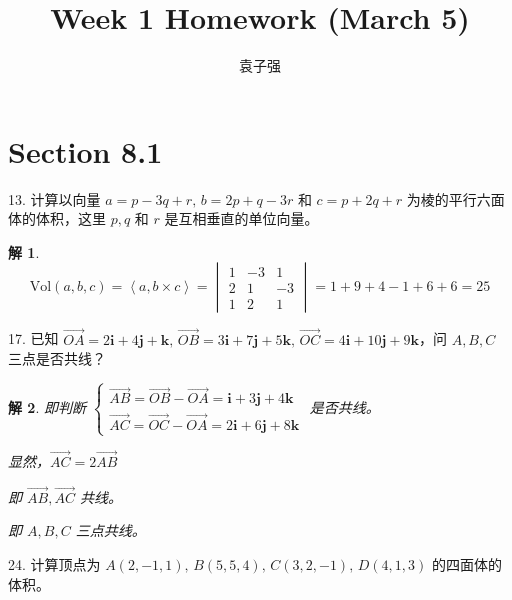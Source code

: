 \documentclass[a4paper,12pt]{article}
\title{Week 1 Homework (March 5)}
\author{袁子强}
\newtheorem*{解}{解}
\begin{document}
\maketitle

\section*{Section 8.1}

13. 计算以向量 $a=p-3q+r,\,b=2p+q-3r$ 和 $c=p+2q+r$ 为棱的平行六面体的体积，这里 $p,q$ 和 $r$ 是互相垂直的单位向量。

\begin{解}
$$\text{Vol}(a,b,c)=\left<a,b\times c\right>=\begin{vmatrix}
        1 & -3 & 1  \\
        2 & 1  & -3 \\
        1 & 2  & 1
    \end{vmatrix}=1+9+4-1+6+6=25$$
\end{解}

17. 已知 $\overrightarrow{OA} = 2\boldsymbol{i} + 4\boldsymbol{j} + \boldsymbol{k},\,\overrightarrow{OB} = 3\boldsymbol{i} + 7\boldsymbol{j} + 5\boldsymbol{k},\,\overrightarrow{OC} = 4\boldsymbol{i} + 10\boldsymbol{j} + 9\boldsymbol{k}$，问 $A, B, C$ 三点是否共线？

\begin{解}
即判断 $\begin{cases}\overrightarrow{AB}=\overrightarrow{OB}-\overrightarrow{OA}=\boldsymbol{i} + 3\boldsymbol{j} + 4\boldsymbol{k}\\\overrightarrow{AC}=\overrightarrow{OC}-\overrightarrow{OA}=2\boldsymbol{i} + 6\boldsymbol{j} + 8\boldsymbol{k}\end{cases}$ 是否共线。

显然，$\overrightarrow{AC}=2\overrightarrow{AB}$

即 $\overrightarrow{AB}, \overrightarrow{AC}$ 共线。

即 $A, B, C$ 三点共线。
\end{解}

24. 计算顶点为 $A(2, -1, 1),\,B(5, 5, 4),\,C(3, 2, -1),\,D(4, 1, 3)$ 的四面体的体积。
\end{document}
